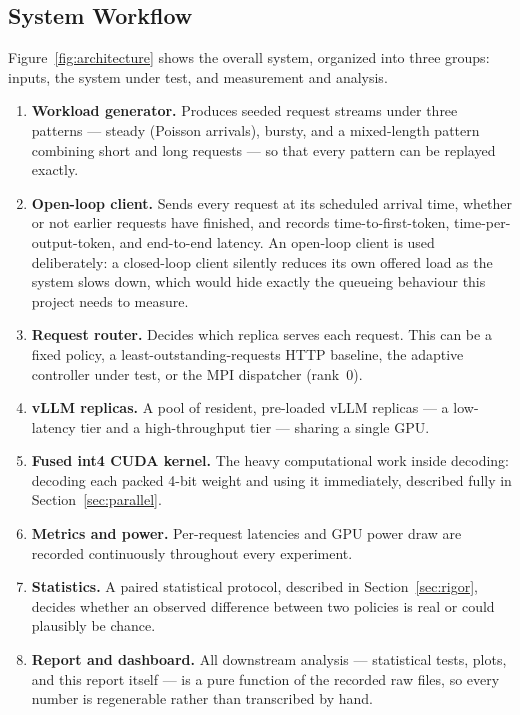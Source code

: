 \documentclass[11pt,a4paper]{article}
\begin{document}
\subsection{System Workflow}
Figure~\ref{fig:architecture} shows the overall system, organized into three groups: inputs, the system under test,
and measurement and analysis.
\begin{enumerate}[leftmargin=1.6em, itemsep=6pt]
  \item \textbf{Workload generator.} Produces seeded request streams under three patterns --- steady (Poisson
        arrivals), bursty, and a mixed-length pattern combining short and long requests --- so that every pattern
        can be replayed exactly.
  \item \textbf{Open-loop client.} Sends every request at its scheduled arrival time, whether or not earlier
        requests have finished, and records time-to-first-token, time-per-output-token, and end-to-end latency. An
        open-loop client is used deliberately: a closed-loop client silently reduces its own offered load as the
        system slows down, which would hide exactly the queueing behaviour this project needs to measure.
  \item \textbf{Request router.} Decides which replica serves each request. This can be a fixed policy, a
        least-outstanding-requests HTTP baseline, the adaptive controller under test, or the MPI dispatcher
        (rank~0).
  \item \textbf{vLLM replicas.} A pool of resident, pre-loaded vLLM replicas --- a low-latency tier and a
        high-throughput tier --- sharing a single GPU.
  \item \textbf{Fused int4 CUDA kernel.} The heavy computational work inside decoding: decoding each packed 4-bit
        weight and using it immediately, described fully in Section~\ref{sec:parallel}.
  \item \textbf{Metrics and power.} Per-request latencies and GPU power draw are recorded continuously throughout
        every experiment.
  \item \textbf{Statistics.} A paired statistical protocol, described in Section~\ref{sec:rigor}, decides whether an
        observed difference between two policies is real or could plausibly be chance.
  \item \textbf{Report and dashboard.} All downstream analysis --- statistical tests, plots, and this report itself
        --- is a pure function of the recorded raw files, so every number is regenerable rather than transcribed by
        hand.
\end{enumerate}
\end{document}
